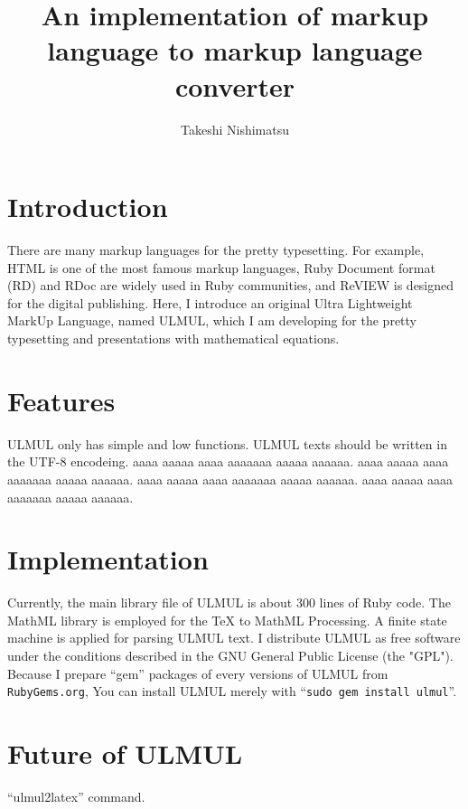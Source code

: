 \documentclass{ajt}            %
\title[Development of a Ultra Lightweight MarkUp Language (ULMUL)]{An implementation of markup language to markup language converter}
\author{Takeshi Nishimatsu}
\begin{document}
\maketitle

\section{Introduction}
There are many markup languages for the pretty typesetting.
For example,
HTML is one of the most famous markup languages,
Ruby Document format (RD)\cite{RDtool} and
RDoc\cite{RDoc} are widely used in Ruby communities, and
ReVIEW is designed for the digital publishing\cite{ReVIEW}.
Here, I introduce an original Ultra Lightweight MarkUp Language, named ULMUL,
which I am developing for the pretty typesetting and presentations
with mathematical equations.

\section{Features}
ULMUL only has simple and low functions.
ULMUL texts should be written in the UTF-8 encodeing.
aaaa aaaaa aaaa aaaaaaa aaaaa aaaaaa\cite{Slidy}.
aaaa aaaaa aaaa aaaaaaa aaaaa aaaaaa\cite{ulmul-rubygems}.
aaaa aaaaa aaaa aaaaaaa aaaaa aaaaaa.
aaaa aaaaa aaaa aaaaaaa aaaaa aaaaaa.



\section{Implementation}
Currently, the main library file of ULMUL is about 300 lines of Ruby code.
The MathML library\cite{ruby-mathml} is employed for the TeX to MathML Processing.
A finite state machine is applied for parsing ULMUL text.
I distribute ULMUL as free software under the conditions described in
the GNU General Public License (the "GPL").
Because I prepare ``gem'' packages of every versions of ULMUL from {\tt RubyGems.org},
You can install ULMUL merely with ``{\tt sudo gem install ulmul}''.

\section{Future of ULMUL}
``ulmul2latex'' command.


\end{document}
